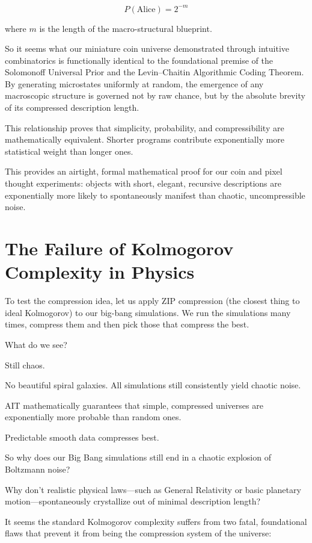 \[
P(\text{Alice}) = 2^{-m}
\]

where $m$ is the length of the macro-structural blueprint. 

So it seems what our miniature coin universe demonstrated through intuitive combinatorics is functionally identical to the foundational premise of the Solomonoff Universal Prior and the Levin--Chaitin Algorithmic Coding Theorem.
By generating microstates uniformly at random, the emergence of any macroscopic structure is governed not by raw chance, but by the absolute brevity of its compressed description length.


This relationship proves that simplicity, probability, and compressibility are mathematically equivalent.
Shorter programs contribute exponentially more statistical weight than longer ones. 

This provides an airtight, formal mathematical proof for our coin and pixel thought experiments: objects with short, elegant, recursive descriptions are exponentially more likely to spontaneously manifest than chaotic, uncompressible noise. 


\section{The Failure of Kolmogorov Complexity in Physics}

To test the compression idea, let us apply ZIP compression (the closest thing to ideal Kolmogorov) to our  big-bang simulations. We run
the simulations many times, compress them and then pick those that compress the best.

What do we see? 

Still chaos.

No beautiful spiral galaxies. All simulations still consistently yield chaotic noise. 

AIT mathematically guarantees that simple, compressed universes are exponentially more probable than random ones.

Predictable smooth data compresses best.

So why does our Big Bang simulations still end in a chaotic explosion of Boltzmann noise?

Why don't realistic physical laws—such as General Relativity or basic planetary motion—spontaneously crystallize out of minimal description length?


It seems the standard Kolmogorov complexity suffers from two fatal, foundational flaws that prevent it from being the compression system of the universe:

